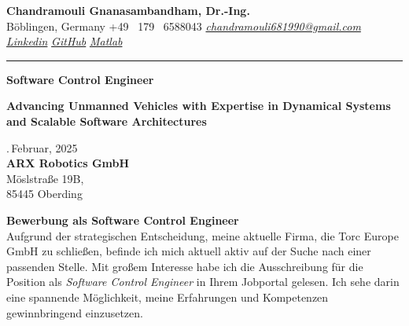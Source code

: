 \documentclass[a4paper,10pt]{article}
\newcommand{\link}[1]{{\textit{#1}}}
\begin{document}
\thispagestyle{plain}

\begin{center}
    {\Large \textbf{Chandramouli Gnanasambandham, Dr.-Ing.}}\\ 
    
    \vspace{0.2cm}
    \small B\"oblingen, Germany \hfill  \bullet  \hfill  +49 \ 179 \ 6588043 \hfill \bullet  \hfill
    \textup{\href{mailto:chandramouli681990@gmail.com}{\link{chandramouli681990@gmail.com}}} \hfill \bullet \hfill
    \textup{\href{https://www.linkedin.com/in/ganasambandhamc/}{\link{Linkedin}}} \hfill \bullet \hfill
    \textup{\href{https://github.com/chandramouli6890}{\link{GitHub}}} \hfill \bullet \hfill
    \textup{\href{https://de.mathworks.com/matlabcentral/profile/authors/4267772}{\link{Matlab}}}

    \vspace{-0.2cm}
    {\rule{\linewidth}{0.8pt}}

    \vspace{0.2cm}
    {\Large \textbf{Software Control Engineer}}
    
    \vspace{0.1cm}
    \colorbox{gray!40}{%
        \parbox{0.99\textwidth}{%
        \centering \textcolor{highlightcolor}{\textbf{Advancing Unmanned Vehicles with Expertise in Dynamical Systems and Scalable Software Architectures}}
        }%
    }
\end{center}

\vspace{0.5cm}
.\,Februar, 2025\\

{\noindent
\textbf{ARX Robotics GmbH}\\
M\"oslstra{\ss}e 19B,\\
85445 Oberding \\
}

\noindent \textbf{Bewerbung als Software Control Engineer} \\

\noindent Aufgrund der strategischen Entscheidung, meine aktuelle Firma, die
Torc Europe GmbH zu schließen, befinde ich mich aktuell aktiv auf der Suche
nach einer passenden Stelle. Mit großem Interesse habe ich die Ausschreibung
für die Position als \textit{Software Control Engineer} in Ihrem Jobportal
gelesen. Ich sehe darin eine spannende Möglichkeit, meine Erfahrungen und
Kompetenzen gewinnbringend einzusetzen. \\
\end{document}
